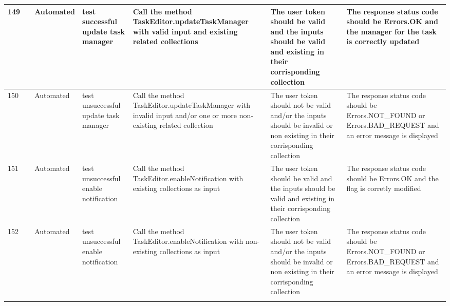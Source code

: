 \documentclass{article}
\begin{document}
{\begin{tabular}{|
    >{\columncolor[HTML]{FFFFFF}}l |
    >{\columncolor[HTML]{FFFFFF}}c |
    >{\columncolor[HTML]{FFFFFF}}l |l|l|l|l|}
    149                                 & \cellcolor[HTML]{FFFFFF}                                    & {\color[HTML]{11734B} Automated} & test successful update task manager                 & Call the method TaskEditor.updateTaskManager with valid input and existing related collections                             & The user token should be valid and the inputs should be valid and existing in their corrisponding collection                                             & The response status code should be Errors.OK and the manager for the task is correctly updated                \\ \cline{1-1} \cline{3-7} 
    150                                 & \cellcolor[HTML]{FFFFFF}                                    & {\color[HTML]{11734B} Automated} & test unsuccessful update task manager               & Call the method TaskEditor.updateTaskManager with invalid input and/or one or more non-existing related collection         & The user token should not be valid and/or the inputs should be invalid or non existing in their corrisponding collection                                 & The response status code should be Errors.NOT\_FOUND or Errors.BAD\_REQUEST and an error message is displayed \\ \cline{1-1} \cline{3-7} 
    151                                 & \cellcolor[HTML]{FFFFFF}                                    & {\color[HTML]{11734B} Automated} & test unsuccessful enable notification               & Call the method TaskEditor.enableNotification with existing collections as input                                           & The user token should be valid and the inputs should be valid and existing in their corrisponding collection                                             & The response status code should be Errors.OK and the flag is corretly modified                                \\ \cline{1-1} \cline{3-7} 
    152                                 & \cellcolor[HTML]{FFFFFF}                                    & {\color[HTML]{11734B} Automated} & test unsuccessful enable notification               & Call the method TaskEditor.enableNotification with non-existing collections as input                                       & The user token should not be valid and/or the inputs should be invalid or non existing in their corrisponding collection                                 & The response status code should be Errors.NOT\_FOUND or Errors.BAD\_REQUEST and an error message is displayed \\ \cline{1-1} \cline{3-7} 

\end{tabular}}
\end{document}
